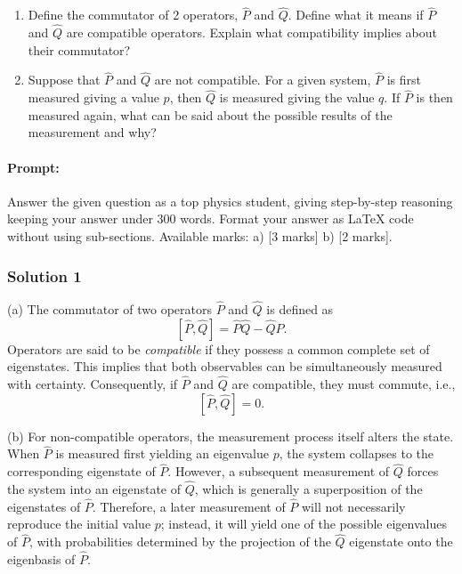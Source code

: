 \documentclass{article}
\begin{document}
\begin{enumerate}
    \item[(a)] Define the commutator of 2 operators, $\hat{P}$ and $\hat{Q}$. Define what it means if $\hat{P}$ and $\hat{Q}$ are compatible operators. Explain what compatibility implies about their commutator?
    \item[(b)] Suppose that $\hat{P}$ and $\hat{Q}$ are not compatible. For a given system, $\hat{P}$ is first measured giving a value $p$, then $\hat{Q}$ is measured giving the value $q$. If $\hat{P}$ is then measured again, what can be said about the possible results of the measurement and why?
\end{enumerate}

\paragraph{Prompt: \\} 
Answer the given question as a top physics student, giving step-by-step reasoning keeping your answer under 300 words. Format your answer as LaTeX code without using sub-sections. Available marks: a) [3 marks] b) [2 marks].

\subsubsection{Solution 1}

(a)
The commutator of two operators $\hat{P}$ and $\hat{Q}$ is defined as 
\[
[\hat{P},\hat{Q}] = \hat{P}\hat{Q} - \hat{Q}\hat{P}.
\]
Operators are said to be \emph{compatible} if they possess a common complete set of eigenstates. This implies that both observables can be simultaneously measured with certainty. Consequently, if $\hat{P}$ and $\hat{Q}$ are compatible, they must commute, i.e.,
\[
[\hat{P},\hat{Q}] = 0.
\]

(b)
For non-compatible operators, the measurement process itself alters the state. When $\hat{P}$ is measured first yielding an eigenvalue $p$, the system collapses to the corresponding eigenstate of $\hat{P}$. However, a subsequent measurement of $\hat{Q}$ forces the system into an eigenstate of $\hat{Q}$, which is generally a superposition of the eigenstates of $\hat{P}$. Therefore, a later measurement of $\hat{P}$ will not necessarily reproduce the initial value $p$; instead, it will yield one of the possible eigenvalues of $\hat{P}$, with probabilities determined by the projection of the $\hat{Q}$ eigenstate onto the eigenbasis of $\hat{P}$.
\end{document}
